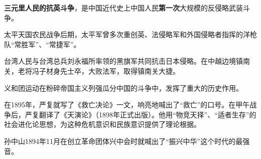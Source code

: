 {\textbf{{三元里人民的抗英斗争}}}{，是中国近代史上中国人民}{\textbf{{第一次}}}{大规模的反侵略武装斗争。}

{太平天国农民战争后期，太平军曾多次重创英、法侵略军和外国侵略者指挥的洋枪队``常胜军''、``常捷军''。}

{台湾人民与台湾总兵刘永福所率领的}{黑旗军}{共同抗击日本侵略。在中越边境镇南关，老将冯子材身先士卒，大败法军，取得}{镇南关大捷}{。}

{义和团运动在粉碎帝国主义列强瓜分中国的斗争中，发挥了重大的历史作用。}

{在}{1895}{年，严复就写了}{《救亡决论》}{一文，响亮地喊出了``救亡''的口号。在甲午战争后，严复翻译了}{《天演论》（}{1898}{年正式出版）。他用``物竞天择''、``适者生存''的社会进化论思想，为这种危机意识和民族意识提供了理论根据。}

{孙中山1894年11月在创立革命团体兴中会时就喊出了``}{振兴中华}{''这个时代的最强音。}
